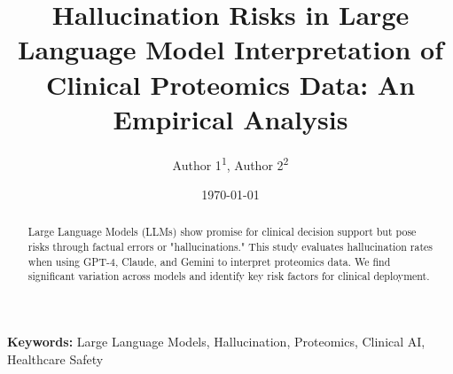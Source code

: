 \documentclass[12pt,a4paper]{article}
\title{Hallucination Risks in Large Language Model Interpretation of Clinical Proteomics Data: An Empirical Analysis}
\author{Author 1\textsuperscript{1}, Author 2\textsuperscript{2}}
\date{\today}
\begin{document}
\maketitle

\begin{abstract}
Large Language Models (LLMs) show promise for clinical decision support but pose risks through factual errors or "hallucinations." This study evaluates hallucination rates when using GPT-4, Claude, and Gemini to interpret proteomics data. We find significant variation across models and identify key risk factors for clinical deployment.
\end{abstract}

\textbf{Keywords:} Large Language Models, Hallucination, Proteomics, Clinical AI, Healthcare Safety










\end{document}
